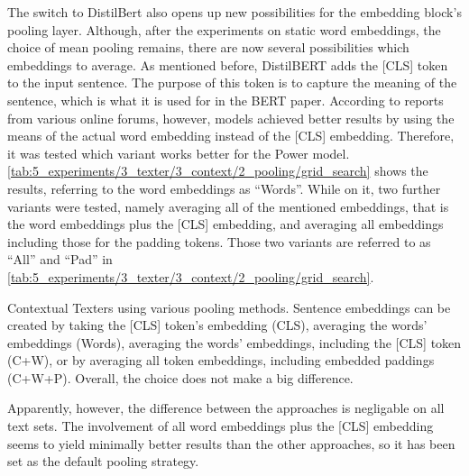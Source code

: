 The switch to DistilBert also opens up new possibilities for the embedding block's pooling layer. Although, after the experiments on static word embeddings, the choice of mean pooling remains, there are now several possibilities which embeddings to average. As mentioned before, DistilBERT adds the [CLS] token to the input sentence. The purpose of this token is to capture the meaning of the sentence, which is what it is used for in the BERT paper. According to reports from various online forums, however, models achieved better results by using the means of the actual word embedding instead of the [CLS] embedding. Therefore, it was tested which variant works better for the Power model. \autoref{tab:5_experiments/3_texter/3_context/2_pooling/grid_search} shows the results, referring to the word embeddings as ``Words''. While on it, two further variants were tested, namely averaging all of the mentioned embeddings, that is the word embeddings plus the [CLS] embedding, and averaging all embeddings including those for the padding tokens. Those two variants are referred to as ``All'' and ``Pad'' in \autoref{tab:5_experiments/3_texter/3_context/2_pooling/grid_search}.

\begin{table}[h]
    \centering
    
    \caption{Contextual Texters using various pooling methods. Sentence embeddings can be created by taking the [CLS] token's embedding (CLS), averaging the words' embeddings (Words), averaging the words' embeddings, including the [CLS] token (C+W), or by averaging all token embeddings, including embedded paddings (C+W+P). Overall, the choice does not make a big difference.}
    \label{tab:5_experiments/3_texter/3_context/2_pooling/grid_search}
\end{table}

Apparently, however, the difference between the approaches is negligable on all text sets. The involvement of all word embeddings plus the [CLS] embedding seems to yield minimally better results than the other approaches, so it has been set as the default pooling strategy.
